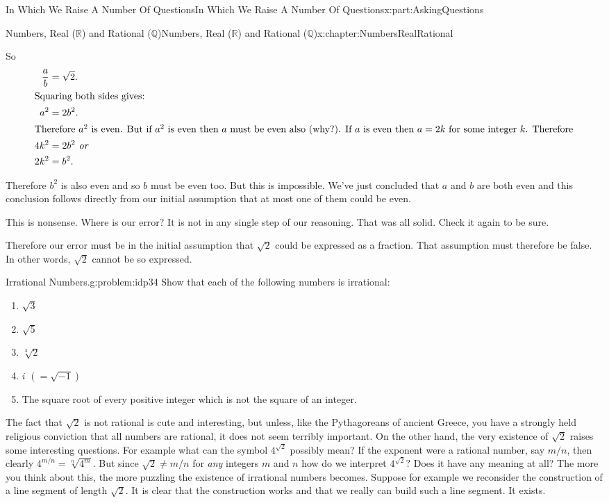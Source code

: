 \documentclass[oneside,10pt,]{book}
\numberwithin{equation}{section}
\newcommand{\RR}{\mathbb {R}}
\newcommand{\QQ}{\mathbb {Q}}
\newcommand{\amp}{&}
\begin{document}
\begin{partptx}{In Which We Raise A Number Of Questions}{}{In Which We Raise A Number Of Questions}{}{}{x:part:AskingQuestions}
\begin{chapterptx}{Numbers, Real (\(\RR\)) and Rational (\(\QQ\))}{}{Numbers, Real (\(\RR\)) and Rational (\(\QQ\))}{}{}{x:chapter:NumbersRealRational}
\begin{introduction}{}
\par
So%
\begin{align*}
\frac{a}{b} \amp = \sqrt{2}.\\
\intertext{Squaring both sides gives:}
a^2 \amp = 2b^2.\\
\intertext{Therefore \(a^2\) is even. But if \(a^2\) is even then \(a\) must be even also (why?). If \(a\) is even then \(a=2k\) for some integer \(k\). Therefore}
4k^2\amp =2b^2\textit{ or}\\
2k^2\amp = b^2\text{.}
\end{align*}
%
\par
Therefore \(b^2\) is also even and so \(b\) must be even too. But this is impossible. We've just concluded that \(a\) and \(b\) are both even and this conclusion follows directly from our initial assumption that at most one of them could be even.%
\par
This is nonsense. Where is our error? It is not in any single step of our reasoning. That was all solid. Check it again to be sure.%
\par
Therefore our error must be in the initial assumption that \(\sqrt{2}\) could be expressed as a fraction. That assumption must therefore be false. In other words, \(\sqrt{2}\) cannot be so expressed.%
\begin{problem}{Irrational Numbers.}{g:problem:idp34}%
Show that each of the following numbers is irrational:%
\begin{enumerate}[font=\bfseries,label=(\alph*),ref=\alph*]
\item{}\(\sqrt{3}\)%
\item{}\(\sqrt{5}\)%
\item{}\(\sqrt[3]{2}\)%
\item{}\(i\) \((=\sqrt{-1})\)%
\item{}The square root of every positive integer which is not the square of an integer.%
\end{enumerate}
\end{problem}
 The fact that \(\sqrt{2}\) is not rational is cute and interesting, but unless, like the Pythagoreans of ancient Greece, you have a strongly held religious conviction that all numbers are rational, it does not seem terribly important. On the other hand, the very existence of \(\sqrt{2}\) raises some interesting questions. For example what can the symbol \(4^{\sqrt{2}}\) possibly mean? If the exponent were a rational number, say \(m/n\), then clearly \(4^{m/n}=\sqrt[n]{4^m}\). But since \(\sqrt{2}\neq m/n\) for \emph{any} integers \(m\) and \(n\) how do we interpret \(4^{\sqrt{2}}?\) Does it have any meaning at all? The more you think about this, the more puzzling the existence of irrational numbers becomes. Suppose for example we reconsider the construction of a line segment of length \(\sqrt{2}\). It is clear that the construction works and that we really can build such a line segment. It exists.%

\end{introduction}
\end{chapterptx}
\end{partptx}
\end{document}
